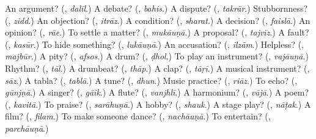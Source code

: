 \begin{tcolorbox}[breakable,colback=teal!4,colframe=teal!35!black,title={Before you move on}]
An argument? (\textbf{}, \emph{dalīl}.) A debate? (\textbf{}, \emph{bahis}.) A dispute? (\textbf{}, \emph{takrār}.) Stubbornness? (\textbf{}, \emph{zidd}.) An objection? (\textbf{}, \emph{itrāz}.) A condition? (\textbf{}, \emph{sharat}.) A decision? (\textbf{}, \emph{faislā}.) An opinion? (\textbf{}, \emph{rāe}.) To settle a matter? (\textbf{}, \emph{mukāuṇā}.) A proposal? (\textbf{}, \emph{tajvīz}.) A fault? (\textbf{}, \emph{kasūr}.) To hide something? (\textbf{}, \emph{lukāuṇā}.) An accusation? (\textbf{}, \emph{ilzām}.) Helpless? (\textbf{}, \emph{majbūr}.) A pity? (\textbf{}, \emph{afsos}.) A drum? (\textbf{}, \emph{ḍhol}.) To play an instrument? (\textbf{}, \emph{vajāuṇā}.) Rhythm? (\textbf{}, \emph{tāl}.) A drumbeat? (\textbf{}, \emph{thāp}.) A clap? (\textbf{}, \emph{tāṛī}.) A musical instrument? (\textbf{}, \emph{sāz}.) A tabla? (\textbf{}, \emph{tablā}.) A tune? (\textbf{}, \emph{dhun}.) Music practice? (\textbf{}, \emph{riāz}.) To echo? (\textbf{}, \emph{gūnjṇā}.) A singer? (\textbf{}, \emph{gāik}.) A flute? (\textbf{}, \emph{vanjhlī}.) A harmonium? (\textbf{}, \emph{vājā}.) A poem? (\textbf{}, \emph{kavitā}.) To praise? (\textbf{}, \emph{sarāhuṇā}.) A hobby? (\textbf{}, \emph{shauk}.) A stage play? (\textbf{}, \emph{nāṭak}.) A film? (\textbf{}, \emph{filam}.) To make someone dance? (\textbf{}, \emph{nachāuṇā}.) To entertain? (\textbf{}, \emph{parchāuṇā}.)
\end{tcolorbox}
